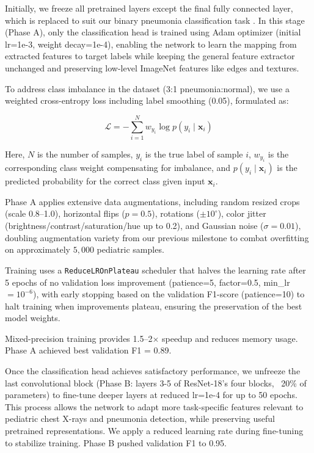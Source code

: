 \documentclass[11pt]{article}
\begin{document}
Initially, we freeze all pretrained layers except the final fully connected layer, which is replaced to suit our binary pneumonia classification task . In this stage (Phase A), only the classification head is trained using Adam optimizer (initial lr=1e-3, weight decay=1e-4), enabling the network to learn the mapping from extracted features to target labels while keeping the general feature extractor unchanged and preserving low-level ImageNet features like edges and textures.

To address class imbalance in the dataset (3:1 pneumonia:normal), we use a weighted cross-entropy loss including label smoothing (0.05), formulated as:

\begin{equation}
\mathcal{L} = - \sum_{i=1}^N w_{y_i} \log p(y_i \mid \mathbf{x}_i)
\label{eq:weighted_cross_entropy}
\end{equation}

Here, \(N\) is the number of samples, \(y_i\) is the true label of sample \(i\), \(w_{y_i}\) is the corresponding class weight compensating for imbalance, and \(p(y_i \mid \mathbf{x}_i)\) is the predicted probability for the correct class given input \(\mathbf{x}_i\).

Phase A applies extensive data augmentations, including random resized crops (scale 0.8--1.0), 
horizontal flips ($p=0.5$), rotations ($\pm 10^\circ$), color jitter 
(brightness/contrast/saturation/hue up to 0.2), and Gaussian noise ($\sigma=0.01$), 
doubling augmentation variety from our previous milestone to combat overfitting 
on approximately $5{,}000$ pediatric samples. 

Training uses a \texttt{ReduceLROnPlateau} scheduler that halves the learning rate 
after 5 epochs of no validation loss improvement (patience=5, factor=0.5, 
min\_lr $= 10^{-6}$), with early stopping based on the validation F1-score 
(patience=10) to halt training when improvements plateau, ensuring the preservation 
of the best model weights. 

Mixed-precision training provides 1.5--2$\times$ speedup and reduces memory usage. 
Phase A achieved best validation F1 = 0.89.



Once the classification head achieves satisfactory performance, we unfreeze the last convolutional block (Phase B: layers 3-5 of ResNet-18's four blocks, ~20\% of parameters) to fine-tune deeper layers at reduced lr=1e-4 for up to 50 epochs. This process allows the network to adapt more task-specific features relevant to pediatric chest X-rays and pneumonia detection, while preserving useful pretrained representations. We apply a reduced learning rate during fine-tuning to stabilize training. Phase B pushed validation F1 to 0.95.
\end{document}
